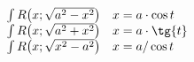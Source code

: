 \begin{center}\normalsize{}\end{center}

$$
\begin{array}{lll}
  \int R\big(x;\sqrt{a^2-x^2}\big) & x = a \cdot \cos{t} & \\
  \int R\big(x;\sqrt{a^2+x^2}\big) & x = a \cdot \tg{t}  & \\
  \int R\big(x;\sqrt{x^2-a^2}\big) & x = a / \cos{t} & \\
  \end{array}
$$